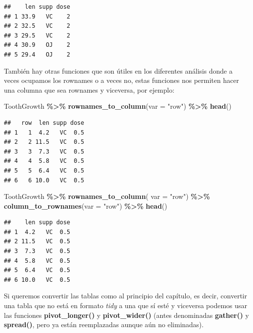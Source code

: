 \documentclass[
]{book}
\newenvironment{Shaded}{\begin{snugshade}}{\end{snugshade}}
\newcommand{\AttributeTok}[1]{\textcolor[rgb]{0.13,0.29,0.53}{#1}}
\newcommand{\FunctionTok}[1]{\textcolor[rgb]{0.13,0.29,0.53}{\textbf{#1}}}
\newcommand{\NormalTok}[1]{#1}
\newcommand{\SpecialCharTok}[1]{\textcolor[rgb]{0.81,0.36,0.00}{\textbf{#1}}}
\newcommand{\StringTok}[1]{\textcolor[rgb]{0.31,0.60,0.02}{#1}}
\begin{document}
\begin{verbatim}
##    len supp dose
## 1 33.9   VC    2
## 2 32.5   VC    2
## 3 29.5   VC    2
## 4 30.9   OJ    2
## 5 29.4   OJ    2
\end{verbatim}

\hfill\break
También hay otras funciones que son útiles en los diferentes análisis donde a veces ocupamos los rownames o a veces no, estas funciones nos permiten hacer una columna que sea rownames y viceversa, por ejemplo:\\

\begin{Shaded}
\begin{Highlighting}[]
\NormalTok{ToothGrowth }\SpecialCharTok{\%\textgreater{}\%} \FunctionTok{rownames\_to\_column}\NormalTok{(}\AttributeTok{var =} \StringTok{"row"}\NormalTok{) }\SpecialCharTok{\%\textgreater{}\%} \FunctionTok{head}\NormalTok{()}
\end{Highlighting}
\end{Shaded}

\begin{verbatim}
##   row  len supp dose
## 1   1  4.2   VC  0.5
## 2   2 11.5   VC  0.5
## 3   3  7.3   VC  0.5
## 4   4  5.8   VC  0.5
## 5   5  6.4   VC  0.5
## 6   6 10.0   VC  0.5
\end{verbatim}

\begin{Shaded}
\begin{Highlighting}[]
\NormalTok{ToothGrowth }\SpecialCharTok{\%\textgreater{}\%} \FunctionTok{rownames\_to\_column}\NormalTok{(}
  \AttributeTok{var =} \StringTok{"row"}\NormalTok{) }\SpecialCharTok{\%\textgreater{}\%} \FunctionTok{column\_to\_rownames}\NormalTok{(}\AttributeTok{var =} \StringTok{"row"}\NormalTok{) }\SpecialCharTok{\%\textgreater{}\%} \FunctionTok{head}\NormalTok{()}
\end{Highlighting}
\end{Shaded}

\begin{verbatim}
##    len supp dose
## 1  4.2   VC  0.5
## 2 11.5   VC  0.5
## 3  7.3   VC  0.5
## 4  5.8   VC  0.5
## 5  6.4   VC  0.5
## 6 10.0   VC  0.5
\end{verbatim}

\hfill\break
Si queremos convertir las tablas como al principio del capítulo, es decir, convertir una tabla que no está en formato \emph{tidy} a una que sí esté y viceversa podemos usar las funciones \textbf{pivot\_longer()} y \textbf{pivot\_wider()} (antes denominadas \textbf{gather()} y \textbf{spread()}, pero ya están reemplazadas aunque aún no eliminadas).\\
\end{document}
